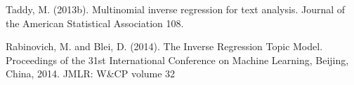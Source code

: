 \documentclass[12pt]{article}
\begin{document}
\begin{thebibliography}{99}
 Taddy, M. (2013b). Multinomial inverse regression for text analysis. Journal of the American Statistical Association 108.

 Rabinovich, M. and Blei, D. (2014). The Inverse Regression Topic Model. Proceedings of the 31st International Conference on Machine Learning, Beijing, China, 2014. JMLR: W\&CP volume 32








\end{thebibliography}
\end{document}
